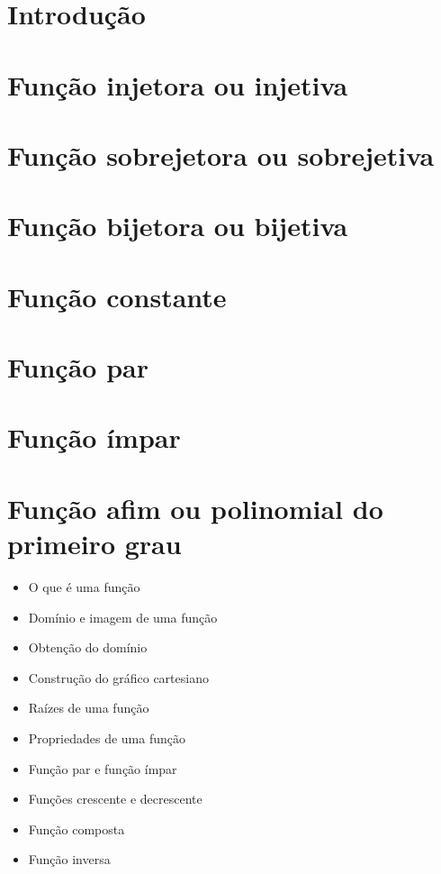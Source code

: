 \chapter{Introdução}

\chapter{Função injetora ou injetiva}

\chapter{Função sobrejetora ou sobrejetiva}

\chapter{Função bijetora ou bijetiva}

\chapter{Função constante}

\chapter{Função par}

\chapter{Função ímpar}

\chapter{Função afim ou polinomial do primeiro grau}
    \begin{itemize}
    	\item O que é uma função
    	\item Domínio e imagem de uma função
    	\item Obtenção do domínio
    	\item Construção do gráfico cartesiano
    	\item Raízes de uma função
    	\item Propriedades de uma função
    	\item Função par e função ímpar
    	\item Funções crescente e decrescente
    	\item Função composta
    	\item Função inversa
    \end{itemize}

